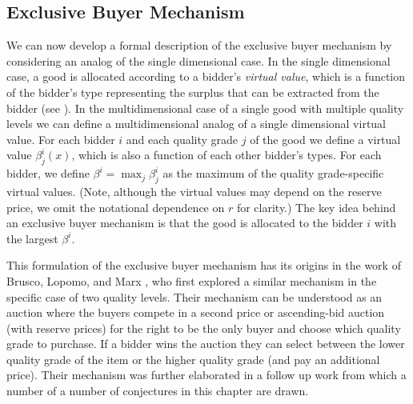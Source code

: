 \documentclass{article}
\begin{document}
\subsection{Exclusive Buyer Mechanism}\label{subsec_exclusive buyer mechanism}

We can now develop a formal description of the exclusive buyer mechanism by considering an analog of the single dimensional case. In the single dimensional case, a good is allocated according to a bidder's \textit{virtual value}, which is a function of the bidder's type representing the surplus that can be extracted from the bidder (see \cite{myerson1981optimal}). In the multidimensional case of a single good with multiple quality levels we can define a multidimensional analog of a single dimensional virtual value. For each bidder $i$ and each quality grade $j$ of the good we define a virtual value $\beta_j^i(x)$, which is also a function of each other bidder's types. For each bidder, we define $\beta^i = \max_j \beta_j^i$ as the maximum of the quality grade-specific virtual values. (Note, although the virtual values may depend on the reserve price, we omit the notational dependence on $r$ for clarity.) The key idea behind an exclusive buyer mechanism is that the good is allocated to the bidder $i$ with the largest $\beta^i$.

This formulation of the exclusive buyer mechanism has its origins in the work of Brusco, Lopomo, and Marx \autocite*{brusco2011}, who first explored a similar mechanism in the specific case of two quality levels. Their mechanism can be understood as an auction where the buyers compete in a second price or ascending-bid auction (with reserve prices) for the right to be the only buyer and choose which quality grade to purchase. If a bidder wins the auction they can select between the lower quality grade of the item or the higher quality grade (and pay an additional price). Their mechanism was further elaborated in a follow up work \autocite{belloni2010multidimensional} from which a number of a number of conjectures in this chapter are drawn. 
\end{document}
